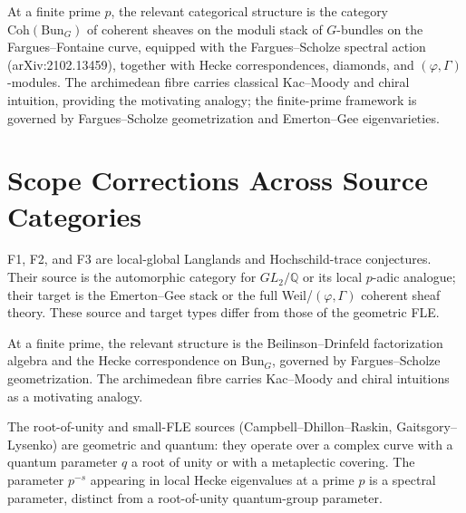 \begin{remark}
\label{v4-arith:fle-audit:rem:finite-prime-replacement}
At a finite prime \(p\), the relevant categorical structure is the
category \(\mathrm{Coh}(\mathrm{Bun}_{G})\) of coherent sheaves on
the moduli stack of \(G\)-bundles on the Fargues--Fontaine curve,
equipped with the Fargues--Scholze spectral action
(arXiv:2102.13459), together with Hecke correspondences, diamonds,
and \((\varphi,\Gamma)\)-modules.
The archimedean fibre carries classical Kac--Moody and chiral
intuition, providing the motivating analogy; the finite-prime
framework is governed by Fargues--Scholze geometrization and
Emerton--Gee eigenvarieties.
\end{remark}

\section{Scope Corrections Across Source Categories}
\label{v4-arith:fle-audit:ledger}

\begin{remark}
\label{v4-arith:fle-audit:rem:local-global-type}
F1, F2, and F3 are local-global Langlands and Hochschild-trace
conjectures. Their source is the automorphic category for
\(GL_{2}/\mathbb{Q}\) or its local \(p\)-adic analogue; their target
is the Emerton--Gee stack or the full Weil/\((\varphi,\Gamma)\)
coherent sheaf theory. These source and target types differ from those
of the geometric FLE.
\end{remark}

\begin{remark}
\label{v4-arith:fle-audit:rem:chiral-at-finite-prime}
At a finite prime, the relevant structure is the
Beilinson--Drinfeld factorization algebra and the Hecke
correspondence on \(\mathrm{Bun}_{G}\), governed by Fargues--Scholze
geometrization. The archimedean fibre carries Kac--Moody and chiral
intuitions as a motivating analogy.
\end{remark}

\begin{remark}
\label{v4-arith:fle-audit:rem:qgroup-scope}
The root-of-unity and small-FLE sources (Campbell--Dhillon--Raskin,
Gaitsgory--Lysenko) are geometric and quantum: they operate over a
complex curve with a quantum parameter \(q\) a root of unity or with
a metaplectic covering. The parameter \(p^{-s}\) appearing in local
Hecke eigenvalues at a prime \(p\) is a spectral parameter, distinct
from a root-of-unity quantum-group parameter.
\end{remark}

